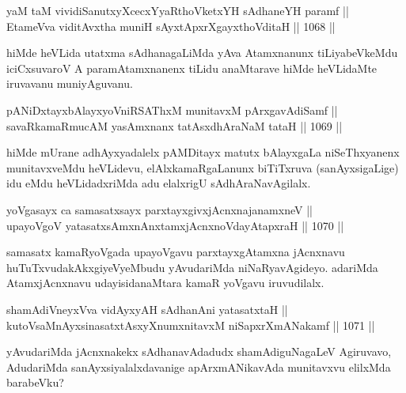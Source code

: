 
\begin{shl}
yaM taM vividiSanutxyXcecxYyaRthoVketxYH sAdhaneYH paramf || \\
EtameVva viditAvx\s tha muniH sAyxtApxrXgayxthoVditaH ||  1068 || 
\end{shl}

\begin{artha}
hiMde heVLida utatxma sAdhanagaLiMda yAva Atamxnanunx tiLiyabeVkeMdu iciCxsuvaroV A paramAtamxnanenx tiLidu anaMtarave hiMde heVLidaMte iruvavanu muniyAguvanu.
\end{artha}


\begin{shl}
pANiDxtayxbAlayxyoVniRSAThxM munitavxM pArxgavAdiSamf || \\
savaRkamaRmucAM yasAmxnanx tatAsxdhAraNaM tataH ||  1069 ||  
\end{shl}

\begin{artha}
hiMde mUrane adhAyxyadalelx pAMDitayx matutx bAlayxgaLa niSeThxyanenx munitavxveMdu heVLidevu, elAlxkamaRgaLanunx biTiTxruva (sanAyxsigaLige) idu eMdu heVLidadxriMda adu elalxrigU sAdhAraNavAgilalx.
\end{artha}


\begin{shl}
yoVgasayx ca samasatxsayx parxtayxgivxjAcnxnajanamxneV || \\
upayoVgoV yatasatxsAmxnAnx\s \s tamxjAcnxnoVdayAtapxraH ||  1070 ||  
\end{shl}

\begin{artha}
samasatx kamaRyoVgada upayoVgavu parxtayxgAtamxna jAcnxnavu huTuTxvudakAkxgiyeVyeMbudu yAvudariMda niNaRyavAgideyo. adariMda AtamxjAcnxnavu udayisidanaMtara kamaR yoVgavu iruvudilalx.
\end{artha}

\begin{shl}
shamAdiVneyxVva vidAyxyAH sAdhanAni yatasatxtaH || \\
kutoV\s saMnAyxsinasatxtAsxyXnumxnitavxM niSapxrXmANakamf ||  1071 ||  
\end{shl}

\begin{artha}
yAvudariMda jAcnxnakekx sAdhanavAdadudx shamAdiguNagaLeV Agiruvavo, AdudariMda sanAyxsiyalalxdavanige apArxmANikavAda munitavxvu elilxMda barabeVku?
\end{artha}

